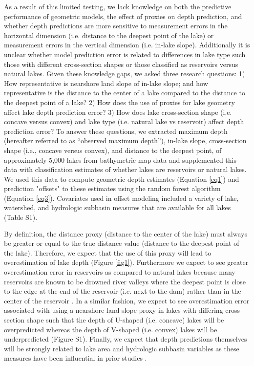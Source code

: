 \documentclass[draft]{agujournal2019}
\begin{document}
As a result of this limited testing, we lack knowledge on both the predictive performance of geometric models, the effect of proxies on depth prediction, and whether depth predictions are more sensitive to measurement errors in the horizontal dimension (i.e. distance to the deepest point of the lake) or measurement errors in the vertical dimension (i.e. in-lake slope). Additionally it is unclear whether model prediction error is related to differences in lake type such those with different cross-section shapes or those classified as reservoirs versus natural lakes. Given these knowledge gaps, we asked three research questions: 1) How representative is nearshore land slope of in-lake slope; and how representative is the distance to the center of a lake compared to the distance to the deepest point of a lake? 2) How does the use of proxies for lake geometry affect lake depth prediction error? 3) How does lake cross-section shape (i.e. concave versus convex) and lake type (i.e. natural lake vs reservoir) affect depth prediction error? To answer these questions, we extracted maximum depth (hereafter referred to as “observed maximum depth”), in-lake slope, cross-section shape (i.e., concave versus convex), and distance to the deepest point, of approximately 5,000 lakes from bathymetric map data and supplemented this data with classification estimates of whether lakes are reservoirs or natural lakes. We used this data to compute geometric depth estimates (Equation \ref{eq1}) and prediction "offsets" to these estimates using the random forest algorithm (Equation \ref{eq3}). Covariates used in offset modeling included a variety of lake, watershed, and hydrologic subbasin measures that are available for all lakes (Table S1).

By definition, the distance proxy (distance to the center of the lake) must always be greater or equal to the true distance value (distance to the deepest point of the lake). Therefore, we expect that the use of this proxy will lead to overestimation of lake depth (Figure \ref{fig1}). Furthermore we expect to see greater overestimation error in reservoirs as compared to natural lakes because many reservoirs are known to be drowned river valleys where the deepest point is close to the edge at the end of the reservoir (i.e. next to the dam) rather than in the center of the reservoir \cite{lanza1985interactions}. In a similar fashion, we expect to see overestimation error associated with using a nearshore land slope proxy in lakes with differing cross-section shape such that the depth of U-shaped (i.e. concave) lakes will be overpredicted whereas the depth of V-shaped (i.e. convex) lakes will be underpredicted (Figure S1). Finally, we expect that depth predictions themselves will be strongly related to lake area and hydrologic subbasin variables as these measures have been influential in prior studies \cite{oliver2016prediction}.
\end{document}

